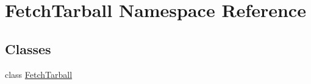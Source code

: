 \hypertarget{namespace_fetch_tarball}{\section{Fetch\-Tarball Namespace Reference}
\label{namespace_fetch_tarball}
}
\subsection*{Classes}
\begin{DoxyCompactItemize}
\item 
class \hyperlink{class_fetch_tarball_1_1_fetch_tarball}{Fetch\-Tarball}
\end{DoxyCompactItemize}
